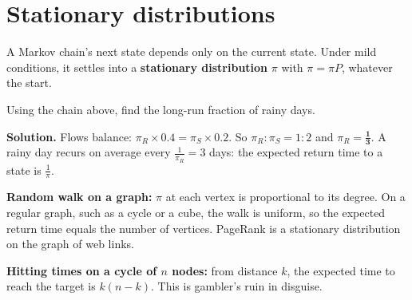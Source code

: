 \documentclass[11pt,a4paper,openany]{report}
\begin{document}
\section{Stationary distributions}
A Markov chain's next state depends only on the current state. Under mild conditions, it settles into a \textbf{stationary distribution} $\pi$ with $\pi=\pi P$, whatever the start.
\begin{center}
\end{center}
\begin{example}[weather]
Using the chain above, find the long-run fraction of rainy days.

\textbf{Solution.} Flows balance: $\pi_R\times0.4=\pi_S\times0.2$. So $\pi_R:\pi_S=1:2$ and $\pi_R=\mathbf{\frac13}$. A rainy day recurs on average every $\frac1{\pi_R}=3$ days: the expected return time to a state is $\frac1{\pi}$.
\end{example}
\textbf{Random walk on a graph:} $\pi$ at each vertex is proportional to its degree. On a regular graph, such as a cycle or a cube, the walk is uniform, so the expected return time equals the number of vertices. PageRank is a stationary distribution on the graph of web links.

\textbf{Hitting times on a cycle of $n$ nodes:} from distance $k$, the expected time to reach the target is $k(n-k)$. This is gambler's ruin in disguise.
\end{document}
